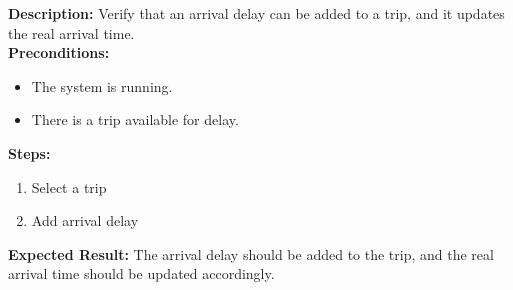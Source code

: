 \documentclass{article}
\begin{document}
\textbf{Description:} Verify that an arrival delay can be added to a trip, and it updates the real arrival time.\\
\textbf{Preconditions:}
\begin{itemize}
  \item The system is running.
  \item There is a trip available for delay.
\end{itemize}
\textbf{Steps:}
\begin{enumerate}
    \item Select a trip
    \item Add arrival delay
\end{enumerate}
\textbf{Expected Result:} The arrival delay should be added to the trip, and the real arrival time should be updated accordingly.

\pagebreak
\end{document}

